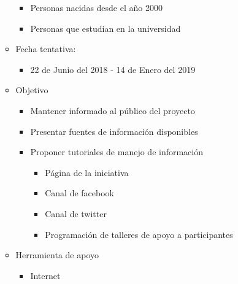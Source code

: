 \documentclass{article}
\begin{document}
\begin{enumerate}
\begin{itemize}
\begin{itemize}
\item Personas nacidas desde el año 2000
\item Personas que estudian en la universidad
\end{itemize}
\item Fecha tentativa:
\begin{itemize}
\item 22 de Junio del 2018 - 14 de Enero del 2019
\end{itemize}
\item Objetivo
\begin{itemize}
\item Mantener informado al público del proyecto
\item Presentar fuentes de información disponibles
\item Proponer tutoriales de manejo de información
\begin{itemize}
\item Página de la iniciativa 
\item Canal de facebook
\item Canal de twitter
\item Programación de talleres de apoyo a participantes
\end{itemize}
\end{itemize}
\item Herramienta de apoyo
\begin{itemize}
\item Internet
\end{itemize}
\end{itemize}


\end{enumerate}
\end{document}

